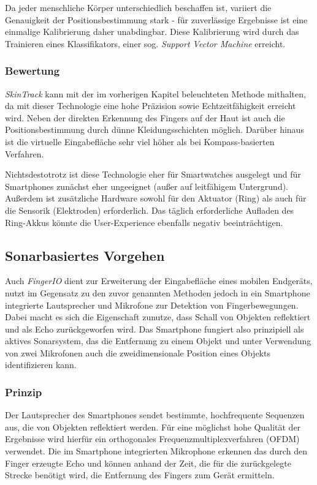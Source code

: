 Da jeder menschliche Körper unterschiedlich beschaffen ist, variiert die Genauigkeit der Positionsbestimmung stark - für zuverlässige Ergebnisse ist eine einmalige Kalibrierung daher unabdingbar. Diese Kalibrierung wird durch das Trainieren eines Klassifikators, einer sog. \textit{Support Vector Machine} erreicht.

\subsubsection{Bewertung}
\textit{SkinTrack} kann mit der im vorherigen Kapitel beleuchteten Methode mithalten, da mit dieser Technologie eine hohe Präzision sowie Echtzeitfähigkeit erreicht wird. Neben der direkten Erkennung des Fingers auf der Haut ist auch die Positionsbestimmung durch dünne Kleidungsschichten möglich. Darüber hinaus ist die virtuelle Eingabefläche sehr viel höher als bei Kompass-basierten Verfahren. 

Nichtsdestotrotz ist diese Technologie eher für Smartwatches ausgelegt und für Smartphones zunächst eher ungeeignet (außer auf leitfähigem Untergrund). Außerdem ist zusätzliche Hardware sowohl für den Aktuator (Ring) als auch für die Sensorik (Elektroden) erforderlich. Das täglich erforderliche Aufladen des Ring-Akkus könnte die User-Experience ebenfalls negativ beeinträchtigen.

\subsection{Sonarbasiertes Vorgehen}

Auch \textit{FingerIO} \cite{Nandakumar.2015} dient zur Erweiterung der Eingabefläche eines mobilen Endgeräts, nutzt im Gegensatz zu den zuvor genannten Methoden jedoch in ein Smartphone integrierte Lautsprecher und Mikrofone zur Detektion von Fingerbewegungen. Dabei macht es sich die Eigenschaft zunutze, dass Schall von Objekten reflektiert und als Echo zurückgeworfen wird. Das Smartphone fungiert also prinzipiell als aktives Sonarsystem, das die Entfernung zu einem Objekt und unter Verwendung von zwei Mikrofonen auch die zweidimensionale Position eines Objekts identifizieren kann.

\subsubsection{Prinzip}
Der Lautsprecher des Smartphones sendet bestimmte, hochfrequente Sequenzen aus, die von Objekten reflektiert werden. Für eine möglichst hohe Qualität der Ergebnisse wird hierfür ein orthogonales Frequenzmultiplexverfahren (OFDM) verwendet. Die im Smartphone integrierten Mikrophone erkennen das durch den Finger erzeugte Echo und können anhand der Zeit, die für die zurückgelegte Strecke benötigt wird, die Entfernung des Fingers zum Gerät ermitteln.

